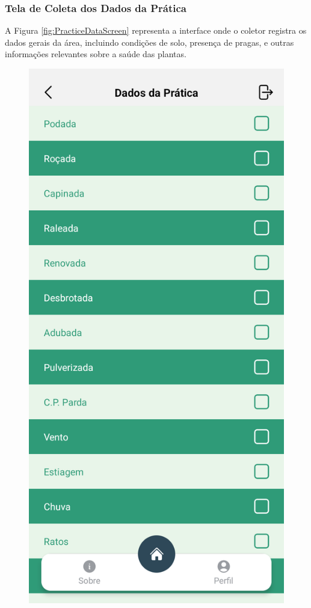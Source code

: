 \subsubsection{Tela de Coleta dos Dados da Prática}
A Figura \ref{fig:PracticeDataScreen} representa a interface onde o coletor registra os dados gerais da área, incluindo condições de solo, presença de pragas, e outras informações relevantes sobre a saúde das plantas.

\begin{figure}[H]
    \centering
    \begin{minipage}[b]{0.30\textwidth}
        \centering
        \includegraphics[width=\textwidth]{images/app/06-practice-data.png}

\end{minipage}
\end{figure}
